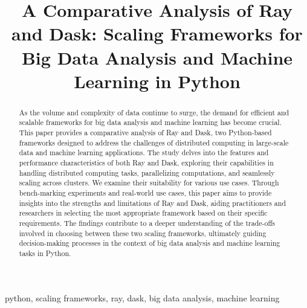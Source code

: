 \documentclass[conference]{IEEEtran}
\begin{document}
\title{A Comparative Analysis of Ray and Dask: Scaling Frameworks for Big Data Analysis and Machine Learning in Python\\
}
\author{
\and
{}
\and
{}
}
\maketitle
\begin{abstract}
As the volume and complexity of data continue to surge, the demand for efficient and scalable frameworks for big data analysis and machine learning has become crucial. This paper provides a comparative analysis of Ray and Dask, two Python-based frameworks designed to address the challenges of distributed computing in large-scale data and machine learning applications. The study delves into the  features and performance characteristics of both Ray and Dask, exploring their capabilities in handling distributed computing tasks, parallelizing computations, and seamlessly scaling across clusters. We examine their suitability for various use cases. Through bench-marking experiments and real-world use cases, this paper aims to provide insights into the strengths and limitations of Ray and Dask, aiding practitioners and researchers in selecting the most appropriate framework based on their specific requirements. The findings contribute to a deeper understanding of the trade-offs involved in choosing between these two scaling frameworks, ultimately guiding decision-making processes in the context of big data analysis and machine learning tasks in Python.
\end{abstract}
\begin{IEEEkeywords}
python, scaling frameworks, ray, dask, big data analysis, machine learning
\end{IEEEkeywords}
\end{document}
